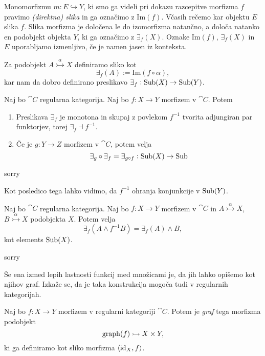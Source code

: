 \documentclass[../kategoricna_logika.tex]{subfiles}
\begin{document}
\begin{definicija}
Monomorfizmu $m : E \hookrightarrow Y$, ki smo ga videli pri dokazu razcepitve morfizma $f$ pravimo \emph{(direktna) slika} in ga označimo z $\mathrm{Im}(f)$.
Včasih rečemo kar objektu $E$ slika $f$. Slika morfizma je določena le do izomorfizma natančno, a določa natanko en podobjekt objekta $Y$, ki ga označimo z $\exists_f(X)$.
Oznake $\mathrm{Im}(f)$, $\exists_f(X)$ in $E$ uporabljamo izmenljivo, če je namen jasen iz konteksta.

Za podobjekt $A \overset{\alpha}{\rightarrowtail} X$ definiramo sliko kot
$$\exists_f(A) := \mathrm{Im}(f \circ \alpha),$$
kar nam da dobro definirano preslikavo $\exists_f : \operatorname{Sub}(X) \to \operatorname{Sub}(Y)$.
\end{definicija}
\begin{lema}
  Naj bo $\cat{C}$ regularna kategorija. Naj bo $f : X \to Y$ morfizem v $\cat{C}$. Potem
  \begin{enumerate}[label=(\roman*)]
    \item Preslikava $\exists_f$ je monotona in skupaj z povlekom $f^{-1}$ tvorita adjungiran par funktorjev, torej $\exists_f \dashv f^{-1}$.
    \item Če je $g : Y \to Z$ morfizem v $\cat{C}$, potem velja $$\exists_g \circ \exists_f = \exists_{g \circ f} : \operatorname{Sub}(X) \to \operatorname{Sub}$$
  \end{enumerate}
\end{lema}
\begin{dokaz}
  sorry
\end{dokaz}

Kot posledico tega lahko vidimo, da $f^{-1}$ ohranja konjunkcije v $\operatorname{Sub}(Y)$.
\begin{lema}
  Naj bo $\cat{C}$ regularna kategorija. Naj bo $f : X \to Y$ morfizem v $\cat{C}$ in $A \overset{\alpha}{\rightarrowtail} X$, $B \overset{\alpha}{\rightarrowtail} X$ podobjekta $X$. Potem velja
  $$\exists_f(A \wedge f^{-1}B) = \exists_f(A) \wedge B,$$
  kot elements $\operatorname{Sub}(X)$.
\end{lema}
\begin{dokaz}
  sorry
\end{dokaz}

Še ena izmed lepih lastnosti funkcij med množicami je, da jih lahko opišemo kot njihov graf. Izkaže se, da je taka konstrukcija mogoča tudi v regularnih kategorijah.
\begin{definicija}
  Naj bo $f : X \to Y$ morfizem v regularni kategoriji $\cat{C}$. Potem je \emph{graf} tega morfizma podobjekt
  $$\operatorname{graph}(f) \rightarrowtail X \times Y,$$
  ki ga definiramo kot sliko morfizma $\langle \mathrm{id}_X, f \rangle$.
\end{definicija}
\end{document}

